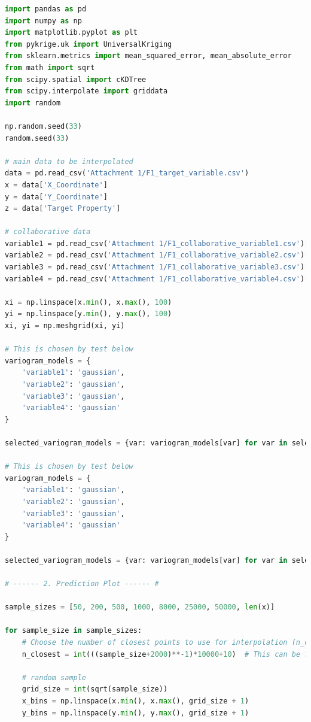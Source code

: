 \documentclass{swmcmthesis}
\begin{document}
\begin{lstlisting}[language=python,caption={The python programme for Problem 3 - Co-Kriging}]
import pandas as pd
import numpy as np
import matplotlib.pyplot as plt
from pykrige.uk import UniversalKriging
from sklearn.metrics import mean_squared_error, mean_absolute_error
from math import sqrt
from scipy.spatial import cKDTree
from scipy.interpolate import griddata
import random

np.random.seed(33)
random.seed(33)

# main data to be interpolated
data = pd.read_csv('Attachment 1/F1_target_variable.csv')
x = data['X_Coordinate']
y = data['Y_Coordinate']
z = data['Target Property']

# collaborative data
variable1 = pd.read_csv('Attachment 1/F1_collaborative_variable1.csv')['Target Property']
variable2 = pd.read_csv('Attachment 1/F1_collaborative_variable2.csv')['Target Property']
variable3 = pd.read_csv('Attachment 1/F1_collaborative_variable3.csv')['Target Property']
variable4 = pd.read_csv('Attachment 1/F1_collaborative_variable4.csv')['Target Property']

xi = np.linspace(x.min(), x.max(), 100)
yi = np.linspace(y.min(), y.max(), 100)
xi, yi = np.meshgrid(xi, yi)

# This is chosen by test below
variogram_models = {
    'variable1': 'gaussian',
    'variable2': 'gaussian',
    'variable3': 'gaussian',
    'variable4': 'gaussian'
}

selected_variogram_models = {var: variogram_models[var] for var in selected_variables}

# This is chosen by test below
variogram_models = {
    'variable1': 'gaussian',
    'variable2': 'gaussian',
    'variable3': 'gaussian',
    'variable4': 'gaussian'
}

selected_variogram_models = {var: variogram_models[var] for var in selected_variables}

# ------ 2. Prediction Plot ------ #

sample_sizes = [50, 200, 500, 1000, 8000, 25000, 50000, len(x)] 

for sample_size in sample_sizes:
    # Choose the number of closest points to use for interpolation (n_closest) based on the sample size
    n_closest = int(((sample_size+2000)**-1)*10000+10)  # This can be further examined and optimized based on the data
    
    # random sample
    grid_size = int(sqrt(sample_size))
    x_bins = np.linspace(x.min(), x.max(), grid_size + 1)
    y_bins = np.linspace(y.min(), y.max(), grid_size + 1)


\end{lstlisting}
\end{document}
